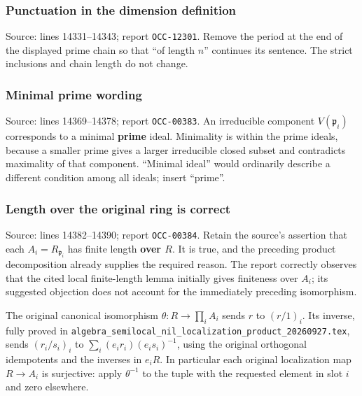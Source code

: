 \subsubsection{Punctuation in the dimension definition}\label{algebra-proof-003-punctuation-in-the-dimension-definition}

Source: lines 14331--14343; report \texttt{OCC-12301}. Remove the period at the end of the displayed prime chain so that ``of length \(n\)'' continues its sentence. The strict inclusions and chain length do not change.

\subsubsection{Minimal prime wording}\label{algebra-proof-003-minimal-prime-wording}

Source: lines 14369--14378; report \texttt{OCC-00383}. An irreducible component \(V(\mathfrak p_i)\) corresponds to a minimal \textbf{prime} ideal. Minimality is within the prime ideals, because a smaller prime gives a larger irreducible closed subset and contradicts maximality of that component. ``Minimal ideal'' would ordinarily describe a different condition among all ideals; insert ``prime''.

\subsubsection{Length over the original ring is correct}\label{algebra-proof-003-length-over-the-original-ring-is-correct}

Source: lines 14382--14390; report \texttt{OCC-00384}. Retain the source's assertion that each \(A_i=R_{\mathfrak p_i}\) has finite length \textbf{over \(R\)}. It is true, and the preceding product decomposition already supplies the required reason. The report correctly observes that the cited local finite-length lemma initially gives finiteness over \(A_i\); its suggested objection does not account for the immediately preceding isomorphism.

The original canonical isomorphism \(\theta:R\to\prod_i A_i\) sends \(r\) to \((r/1)_i\). Its inverse, fully proved in \texttt{algebra\_\allowbreak{}semilocal\_\allowbreak{}nil\_\allowbreak{}localization\allowbreak{}\_\allowbreak{}product\_\allowbreak{}20260927.\allowbreak{}tex}, sends \((r_i/s_i)_i\) to \(\sum_i(e_i r_i)(e_i s_i)^{-1}\), using the original orthogonal idempotents and the inverses in \(e_iR\). In particular each original localization map \(R\to A_i\) is surjective: apply \(\theta^{-1}\) to the tuple with the requested element in slot \(i\) and zero elsewhere.

